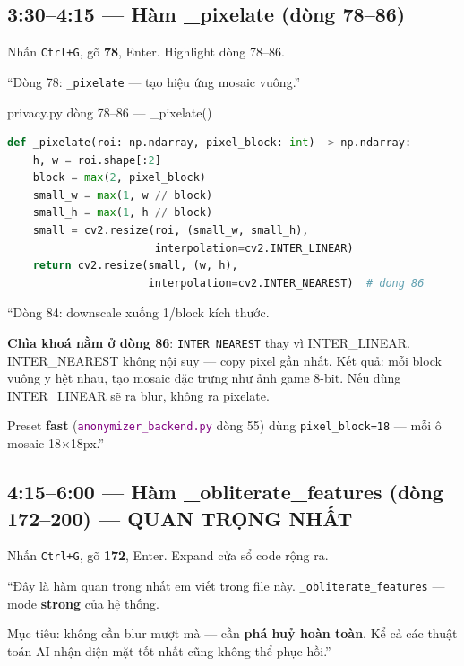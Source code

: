 \documentclass[12pt, a4paper]{article}
\newcommand{\fpath}[1]{\texttt{\textcolor{purple}{#1}}}
\begin{document}
\subsection{3:30--4:15 --- Hàm \_pixelate (dòng 78--86)}

\begin{doact}
Nhấn \texttt{Ctrl+G}, gõ \textbf{78}, Enter. Highlight dòng 78--86.
\end{doact}

\begin{say}
``Dòng 78: \texttt{\_pixelate} --- tạo hiệu ứng mosaic vuông.''
\end{say}

\begin{code}{privacy.py dòng 78--86 --- \_pixelate()}
\begin{lstlisting}[language=Python, firstnumber=78]
def _pixelate(roi: np.ndarray, pixel_block: int) -> np.ndarray:
    h, w = roi.shape[:2]
    block = max(2, pixel_block)
    small_w = max(1, w // block)
    small_h = max(1, h // block)
    small = cv2.resize(roi, (small_w, small_h),
                       interpolation=cv2.INTER_LINEAR)
    return cv2.resize(small, (w, h),
                      interpolation=cv2.INTER_NEAREST)  # dong 86
\end{lstlisting}
\end{code}

\begin{say}
``Dòng 84: downscale xuống 1/block kích thước.

\textbf{Chìa khoá nằm ở dòng 86}: \texttt{INTER\_NEAREST} thay vì INTER\_LINEAR.
INTER\_NEAREST không nội suy --- copy pixel gần nhất.
Kết quả: mỗi block vuông y hệt nhau, tạo mosaic đặc trưng như ảnh game 8-bit.
Nếu dùng INTER\_LINEAR sẽ ra blur, không ra pixelate.

Preset \textbf{fast} (\fpath{anonymizer\_backend.py} dòng 55) dùng \texttt{pixel\_block=18}
--- mỗi ô mosaic 18×18px.''
\end{say}

\subsection{4:15--6:00 --- Hàm \_obliterate\_features (dòng 172--200) --- QUAN TRỌNG NHẤT}

\begin{doact}
Nhấn \texttt{Ctrl+G}, gõ \textbf{172}, Enter. Expand cửa sổ code rộng ra.
\end{doact}

\begin{say}
``Đây là hàm quan trọng nhất em viết trong file này.
\texttt{\_obliterate\_features} --- mode \textbf{strong} của hệ thống.

Mục tiêu: không cần blur mượt mà --- cần \textbf{phá huỷ hoàn toàn}.
Kể cả các thuật toán AI nhận diện mặt tốt nhất cũng không thể phục hồi.''
\end{say}
\end{document}
